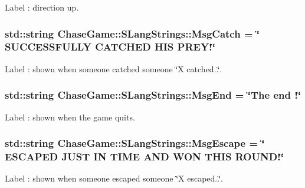 Label \-: direction up. 

\hypertarget{struct_chase_game_1_1_s_lang_strings_a5d6864e670cfe0b90ad02635a38035f4}{
\subsubsection[{Msg\-Catch}]{\setlength{\rightskip}{0pt plus 5cm}std\-::string Chase\-Game\-::\-S\-Lang\-Strings\-::\-Msg\-Catch = \char`\"{} S\-U\-C\-C\-E\-S\-S\-F\-U\-L\-L\-Y C\-A\-T\-C\-H\-E\-D H\-I\-S P\-R\-E\-Y!\char`\"{}}}\label{struct_chase_game_1_1_s_lang_strings_a5d6864e670cfe0b90ad02635a38035f4}


Label \-: shown when someone catched someone \char`\"{}\-X catched..\char`\"{}. 

\hypertarget{struct_chase_game_1_1_s_lang_strings_a257add6b60a691261480e9b1739564e1}{
\subsubsection[{Msg\-End}]{\setlength{\rightskip}{0pt plus 5cm}std\-::string Chase\-Game\-::\-S\-Lang\-Strings\-::\-Msg\-End = \char`\"{}The end !\char`\"{}}}\label{struct_chase_game_1_1_s_lang_strings_a257add6b60a691261480e9b1739564e1}


Label \-: shown when the game quits. 

\hypertarget{struct_chase_game_1_1_s_lang_strings_ac77a3cbdbd63a66e69754666ee88cd78}{
\subsubsection[{Msg\-Escape}]{\setlength{\rightskip}{0pt plus 5cm}std\-::string Chase\-Game\-::\-S\-Lang\-Strings\-::\-Msg\-Escape = \char`\"{} E\-S\-C\-A\-P\-E\-D J\-U\-S\-T I\-N T\-I\-M\-E A\-N\-D W\-O\-N T\-H\-I\-S R\-O\-U\-N\-D!\char`\"{}}}\label{struct_chase_game_1_1_s_lang_strings_ac77a3cbdbd63a66e69754666ee88cd78}


Label \-: shown when someone escaped someone \char`\"{}\-X escaped..\char`\"{}. 

